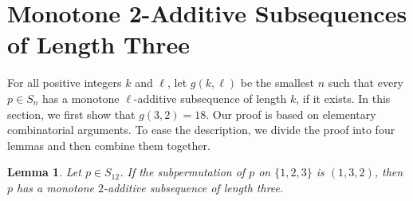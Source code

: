 \documentclass[11pt]{article}
\newtheorem{lemma}[theorem]{Lemma}
\theoremstyle{definition}
\begin{document}
\section{Monotone 2-Additive Subsequences of Length Three}\label{Section:Monotone2-Add}

For all positive integers $k$ and $\ell$, let $g(k,\ell)$ be the smallest $n$ such that every $p\in S_n$ has a monotone $\ell$-additive subsequence of length $k$, if it exists. In this section, we first show that $g(3,2)=18$. Our proof is based on elementary combinatorial arguments. To ease the description, we divide the proof into four lemmas and then combine them together.

\begin{lemma}\label{Lemma:Monotone132}
Let $p\in S_{12}$. If the subpermutation of $p$ on $\{1,2,3\}$ is $(1,3,2)$, then $p$ has a monotone $2$-additive subsequence of length three.
\end{lemma}
\end{document}
